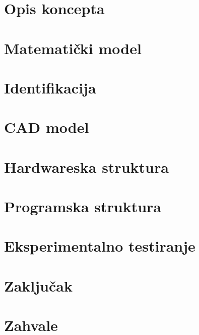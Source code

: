 \documentclass[11pt,a4paper]{article}
\begin{document}
\setcounter{page}{1}

\newpage
\section{Opis koncepta} 


\newpage
\section{Matematički model}


\newpage
\section{Identifikacija}


\newpage
\section{CAD model}


\newpage
\section{Hardwareska struktura}


\newpage
\section{Programska struktura}


\newpage
\section{Eksperimentalno testiranje}



\newpage
\section{Zaključak} 




\newpage
\section*{Zahvale}

\thispagestyle{plain}
\end{document}
